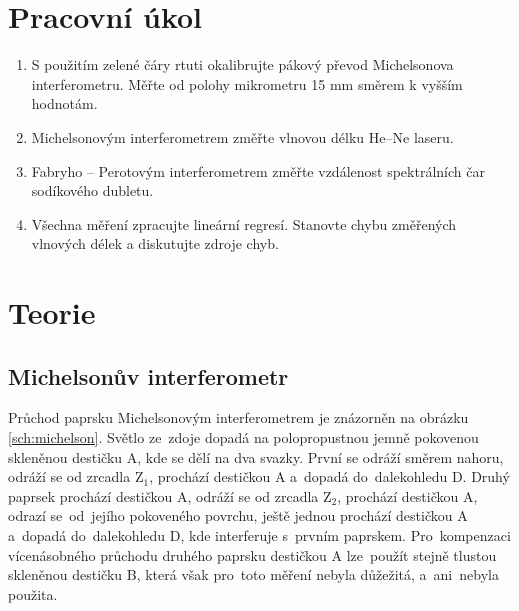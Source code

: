 \documentclass{../concepts/titul_protokol_p/prepareprotokol} %
\begin{document}
\renewcommand{\figurename}{Graf}
\renewcommand{\refname}{Literatura}

\graphicspath{{../concepts/titul_protokol_p/}}
\maketitle

\section{Pracovní úkol}
\begin{enumerate}
    \item S použitím zelené čáry rtuti okalibrujte pákový převod Michelsonova interferometru. Měřte od polohy mikrometru 15 mm směrem k vyšším hodnotám.
    \item Michelsonovým interferometrem změřte vlnovou délku He--Ne laseru.
    \item Fabryho -- Perotovým interferometrem změřte vzdálenost spektrálních čar sodíkového dubletu.
    \item Všechna měření zpracujte lineární regresí. Stanovte chybu změřených vlnových délek a diskutujte zdroje chyb.
\end{enumerate}

\section{Teorie}
\subsection{Michelsonův interferometr}

Průchod paprsku Michelsonovým interferometrem je znázorněn na obrázku \ref{sch:michelson}.
Světlo ze~zdoje dopadá na polopropustnou jemně pokovenou skleněnou destičku A, kde se dělí na dva svazky.
První se odráží směrem nahoru, odráží se od zrcadla $\mathrm{Z}_1$, prochází destičkou A a~dopadá do~dalekohledu D.
Druhý paprsek prochází destičkou A, odráží se od zrcadla $\mathrm{Z}_2$, prochází destičkou A, odrazí
se~od~jejího pokoveného povrchu, ještě jednou prochází destičkou A a~dopadá do~dalekohledu D, kde interferuje
s~prvním paprskem. Pro~kompenzaci vícenásobného průchodu druhého paprsku destičkou A lze~použít 
stejně tlustou skleněnou destičku B, která však pro~toto měření nebyla důžežitá, a~ani~nebyla použita.
\end{document}
